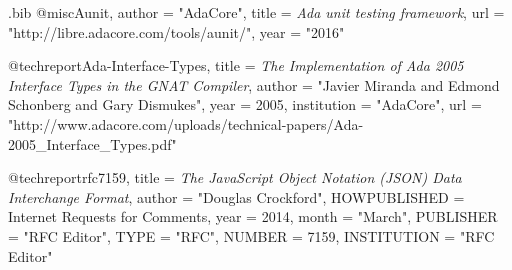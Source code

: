 \documentclass[12pt,a4paper]{article}
\begin{document}
\pagebreak

\begin{filecontents}{\jobname.bib}
@misc{Aunit,
  author = "AdaCore",
  title = {\textit{Ada unit testing framework}},
  url = "http://libre.adacore.com/tools/aunit/",
  year = "2016"
}

@techreport{Ada-Interface-Types,
	title = {\textit{The Implementation of Ada 2005 Interface Types in the GNAT Compiler}},
	author = "Javier Miranda and Edmond Schonberg and Gary Dismukes",
	year = 2005,
	institution = "AdaCore",
	url = "http://www.adacore.com/uploads/technical-papers/Ada-2005_Interface_Types.pdf"
}

@techreport{rfc7159,
	title = {\textit{The JavaScript Object Notation (JSON) Data Interchange Format}},
	author = "Douglas Crockford",
	HOWPUBLISHED = {Internet Requests for Comments},
	year = 2014,
	month = "March",
	PUBLISHER = "{RFC Editor}",
	TYPE = "{RFC}",
	NUMBER = 7159,
	INSTITUTION = "{RFC Editor}"
}
\end{filecontents}



\end{document}
